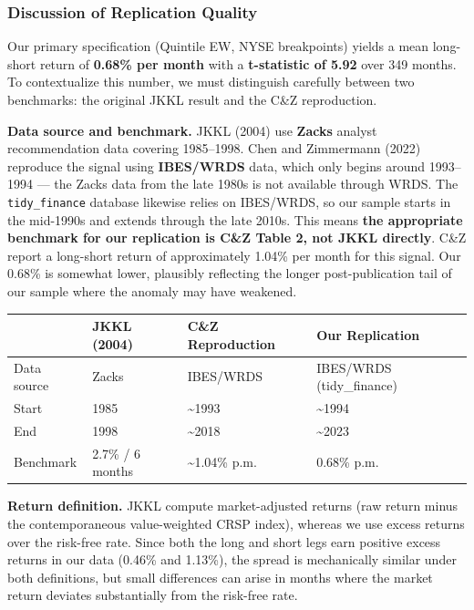 \documentclass[
  letterpaper,
  DIV=11,
  numbers=noendperiod]{scrartcl}
\begin{document}
\subsubsection{Discussion of Replication
Quality}\label{discussion-of-replication-quality}

Our primary specification (Quintile EW, NYSE breakpoints) yields a mean
long-short return of \textbf{0.68\% per month} with a
\textbf{t-statistic of 5.92} over 349 months. To contextualize this
number, we must distinguish carefully between two benchmarks: the
original JKKL result and the C\&Z reproduction.

\textbf{Data source and benchmark.} JKKL (2004) use \textbf{Zacks}
analyst recommendation data covering 1985--1998. Chen and Zimmermann
(2022) reproduce the signal using \textbf{IBES/WRDS} data, which only
begins around 1993--1994 --- the Zacks data from the late 1980s is not
available through WRDS. The \texttt{tidy\_finance} database likewise
relies on IBES/WRDS, so our sample starts in the mid-1990s and extends
through the late 2010s. This means \textbf{the appropriate benchmark for
our replication is C\&Z Table 2, not JKKL directly}. C\&Z report a
long-short return of approximately 1.04\% per month for this signal. Our
0.68\% is somewhat lower, plausibly reflecting the longer
post-publication tail of our sample where the anomaly may have weakened.

\begin{longtable}[]{@{}llll@{}}
\toprule\noalign{}
& JKKL (2004) & C\&Z Reproduction & Our Replication \\
\midrule\noalign{}
\endhead
\bottomrule\noalign{}
\endlastfoot
Data source & Zacks & IBES/WRDS & IBES/WRDS (tidy\_finance) \\
Start & 1985 & \textasciitilde1993 & \textasciitilde1994 \\
End & 1998 & \textasciitilde2018 & \textasciitilde2023 \\
Benchmark & 2.7\% / 6 months & \textasciitilde1.04\% p.m. & 0.68\%
p.m. \\
\end{longtable}

\textbf{Return definition.} JKKL compute market-adjusted returns (raw
return minus the contemporaneous value-weighted CRSP index), whereas we
use excess returns over the risk-free rate. Since both the long and
short legs earn positive excess returns in our data (0.46\% and 1.13\%),
the spread is mechanically similar under both definitions, but small
differences can arise in months where the market return deviates
substantially from the risk-free rate.
\end{document}
